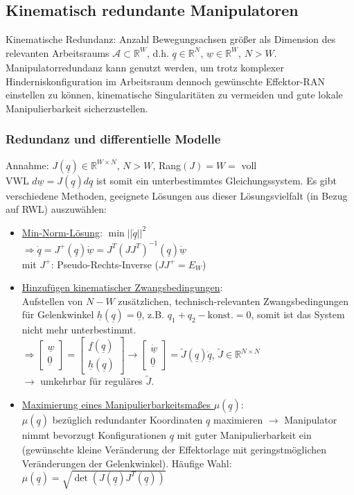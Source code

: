 \documentclass[a4paper,landscape,6pt]{article}
\newcommand{\ma}[1]{\ensuremath{\boldsymbol {#1}}}								%
\newcommand{\mat}[1]{\ensuremath{\begin{bmatrix} #1 \end{bmatrix}}}				%
\newcommand{\ul}[1]{\underline{#1}}
\begin{document}
\begin{multicols}{3}
\subsection*{Kinematisch redundante Manipulatoren}
Kinematische Redundanz: Anzahl Bewegungsachsen größer als Dimension des relevanten Arbeitsraums $\ma{\mathcal{A}}\subset \mathbb{R}^W$, d.h. $\ul q \in \mathbb{R}^N$, $\ul w \in \mathbb{R}^W$, $N>W$.\\
Manipulatorredundanz kann genutzt werden, um trotz komplexer Hinderniskonfiguration im Arbeitsraum dennoch gewünschte Effektor-RAN einstellen zu können, kinematische Singularitäten zu vermeiden und gute lokale Manipulierbarkeit sicherzustellen.
\subsubsection*{Redundanz und differentielle Modelle}
Annahme: $J(\ul q) \in \mathbb{R}^{W \times N}$, $N>W$, Rang$(J) = W =$ voll\\
VWL $ d\ul w = J(\ul q) d\ul q$ ist somit ein unterbestimmtes Gleichungssystem. Es gibt verschiedene Methoden, geeignete Lösungen aus dieser Lösungsvielfalt (in Bezug auf RWL) auszuwählen:\\
\begin{itemize}
	\item \ul{Min-Norm-Lösung}: $\min||\ul{\dot q}||^2$\\
	$\Rightarrow \boxed{\ul{\dot q} = J^+(\ul q) \ul{\dot w} = J^T(JJ^T)^{-1}(\ul q) \ul{\dot w}}$\\
	mit $J^+$: Pseudo-Rechts-Inverse ($JJ^+ = E_W$)
	
	\item \ul{Hinzufügen kinematischer Zwangsbedingungen}:\\
	Aufstellen von $N-W$ zusätzlichen, technisch-relevanten Zwangsbedingungen für Gelenkwinkel $\ul h(\ul q) = \ul 0$, z.B. $q_1 + q_2 - \text{konst.} = 0$, somit ist das System nicht mehr unterbestimmt. \\
	$\Rightarrow \mat{\ul w \\ \ul 0} = \mat{\ul f(\ul q) \\ \ul h(\ul q)} \rightarrow \mat{\ul{\dot w} \\ \ul 0} = \tilde{J}(\ul q) \ul{\dot q}$, $\tilde{J} \in \mathbb{R}^{N\times N}$\\
	$\rightarrow$ umkehrbar für reguläres $\tilde{J}$.
	
	\item \ul{Maximierung eines Manipulierbarkeitsmaßes $\mu(\ul q)$}:\\
	$\mu(\ul q)$ bezüglich redundanter Koordinaten $\ul q$ maximieren $\rightarrow$ Manipulator nimmt bevorzugt Konfigurationen $\ul q$ mit guter Manipulierbarkeit ein (gewünschte kleine Veränderung der Effektorlage mit geringstmöglichen Veränderungen der Gelenkwinkel).
	Häufige Wahl: $\boxed{\mu(\ul q) = \sqrt{\det(J(\ul q)J^T(\ul q))}}$
	

\end{itemize}
\end{multicols}
\end{document}
